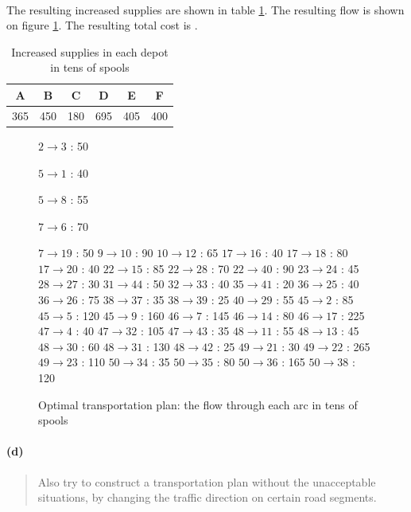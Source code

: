 \paragraph{}
The resulting increased supplies are shown in table \ref{increased-supplies}. The resulting flow is shown on figure \ref{flow3-2c}. The resulting total cost is .

\begin{table}[H]
\centering
\begin{tabular}{|c|c|c|c|c|c|}
\hline
A & B & C & D & E & F \\ \hline
365 & 450 & 180 & 695 & 405 & 400  \\ \hline
\end{tabular}
\caption{Increased supplies in each depot in tens of spools}
\label{increased-supplies}
\end{table}

\begin{figure}[H]
\centering
\begin{multicols}{5}
$ 2 \rightarrow 3 $ : 50

$ 5 \rightarrow 1 $ : 40

$ 5 \rightarrow 8 $ : 55

$ 7 \rightarrow 6 $ : 70

$ 7 \rightarrow 19 $ : 50
$ 9 \rightarrow 10 $ : 90
$ 10 \rightarrow 12 $ : 65
$ 17 \rightarrow 16 $ : 40
$ 17 \rightarrow 18 $ : 80
$ 17 \rightarrow 20 $ : 40
$ 22 \rightarrow 15 $ : 85
$ 22 \rightarrow 28 $ : 70
$ 22 \rightarrow 40 $ : 90
$ 23 \rightarrow 24 $ : 45
$ 28 \rightarrow 27 $ : 30
$ 31 \rightarrow 44 $ : 50
$ 32 \rightarrow 33 $ : 40
$ 35 \rightarrow 41 $ : 20
$ 36 \rightarrow 25 $ : 40
$ 36 \rightarrow 26 $ : 75
$ 38 \rightarrow 37 $ : 35
$ 38 \rightarrow 39 $ : 25
$ 40 \rightarrow 29 $ : 55
$ 45 \rightarrow 2 $ : 85
$ 45 \rightarrow 5 $ : 120
$ 45 \rightarrow 9 $ : 160
$ 46 \rightarrow 7 $ : 145
$ 46 \rightarrow 14 $ : 80
$ 46 \rightarrow 17 $ : 225
$ 47 \rightarrow 4 $ : 40
$ 47 \rightarrow 32 $ : 105
$ 47 \rightarrow 43 $ : 35
$ 48 \rightarrow 11 $ : 55
$ 48 \rightarrow 13 $ : 45
$ 48 \rightarrow 30 $ : 60
$ 48 \rightarrow 31 $ : 130
$ 48 \rightarrow 42 $ : 25
$ 49 \rightarrow 21 $ : 30
$ 49 \rightarrow 22 $ : 265
$ 49 \rightarrow 23 $ : 110
$ 50 \rightarrow 34 $ : 35
$ 50 \rightarrow 35 $ : 80
$ 50 \rightarrow 36 $ : 165
$ 50 \rightarrow 38 $ : 120
\end{multicols}
\caption{Optimal transportation plan: the flow through each arc in tens of spools}
\label{flow3-2c}
\end{figure}

\paragraph{(d)}
\begin{quote}
Also try to construct a transportation plan without the unacceptable situations, by changing the traffic direction on certain road segments.
\end{quote}

\paragraph{}

